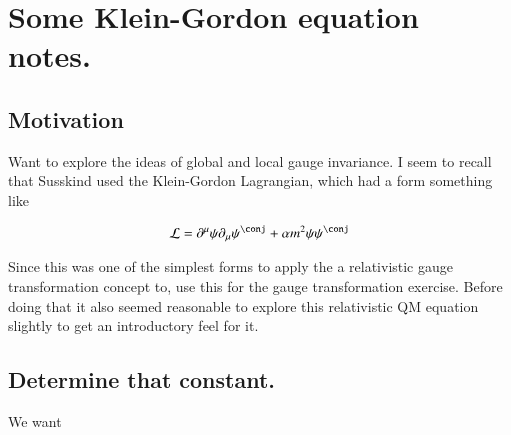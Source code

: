 
%
%




\chapter{Some Klein-Gordon equation notes. }
\label{chap:kleinGordon}
\date{ March 27, 2009.  kleinGordon.tex }

%

\section{Motivation }

Want to explore the ideas of global and local gauge invariance.  I seem to recall that Susskind
used the Klein-Gordon Lagrangian, which had a form something like

\begin{align}\label{eqn:klein_gordon:densityUndeterminedCoeff}
\LL = \partial^\mu \psi \partial_\mu \psi^\conj + \alpha m^2 \psi \psi^\conj
\end{align}

Since this was one of the simplest forms to apply the
a relativistic gauge transformation concept to, use this for the gauge transformation exercise.  Before doing that it also seemed reasonable to
explore this relativistic QM equation slightly to get an introductory feel for it.

\section{Determine that constant. }

We want

